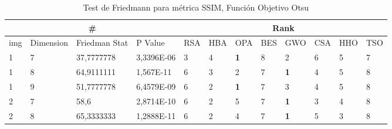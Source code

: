 \documentclass[conference]{IEEEtran}
\begin{document}
\begin{table}[]
	\centering
	\caption{Test de Friedmann para métrica SSIM, Función Objetivo Otsu}
	\begin{tabular}{|llll|llllllll|}
		\hline
		\multicolumn{4}{|c|}{\#} & \multicolumn{8}{c|}{Rank} \\ \hline
		\multicolumn{1}{|l|}{img} & \multicolumn{1}{l|}{Dimension} & \multicolumn{1}{l|}{Friedman Stat} & P Value    & \multicolumn{1}{l|}{RSA} & \multicolumn{1}{l|}{HBA}        & \multicolumn{1}{l|}{OPA}        & \multicolumn{1}{l|}{BES}        & \multicolumn{1}{l|}{GWO}        & \multicolumn{1}{l|}{CSA}        & \multicolumn{1}{l|}{HHO} & TSO                    \\ \hline
		\multicolumn{1}{|l|}{1}   & \multicolumn{1}{l|}{7}         & \multicolumn{1}{l|}{37,7777778}    & 3,3396E-06 & \multicolumn{1}{l|}{3}   & \multicolumn{1}{l|}{4}          & \multicolumn{1}{l|}{\textbf{1}} & \multicolumn{1}{l|}{8}          & \multicolumn{1}{l|}{2}          & \multicolumn{1}{l|}{6}          & \multicolumn{1}{l|}{5}   & 7                      \\ \hline
		\multicolumn{1}{|l|}{1}   & \multicolumn{1}{l|}{8}         & \multicolumn{1}{l|}{64,9111111}    & 1,567E-11  & \multicolumn{1}{l|}{6}   & \multicolumn{1}{l|}{3}          & \multicolumn{1}{l|}{2}          & \multicolumn{1}{l|}{7}          & \multicolumn{1}{l|}{\textbf{1}} & \multicolumn{1}{l|}{4}          & \multicolumn{1}{l|}{5}   & 8                      \\ \hline
		\multicolumn{1}{|l|}{1}   & \multicolumn{1}{l|}{9}         & \multicolumn{1}{l|}{51,7777778}    & 6,4579E-09 & \multicolumn{1}{l|}{6}   & \multicolumn{1}{l|}{2}          & \multicolumn{1}{l|}{\textbf{1}} & \multicolumn{1}{l|}{7}          & \multicolumn{1}{l|}{3}          & \multicolumn{1}{l|}{4}          & \multicolumn{1}{l|}{5}   & 8                      \\ \hline
		\multicolumn{1}{|l|}{2}   & \multicolumn{1}{l|}{7}         & \multicolumn{1}{l|}{58,6}          & 2,8714E-10 & \multicolumn{1}{l|}{6}   & \multicolumn{1}{l|}{2}          & \multicolumn{1}{l|}{5}          & \multicolumn{1}{l|}{7}          & \multicolumn{1}{l|}{\textbf{1}} & \multicolumn{1}{l|}{3}          & \multicolumn{1}{l|}{4}   & 8                      \\ \hline
		\multicolumn{1}{|l|}{2}   & \multicolumn{1}{l|}{8}         & \multicolumn{1}{l|}{65,3333333}    & 1,2888E-11 & \multicolumn{1}{l|}{6}   & \multicolumn{1}{l|}{2}          & \multicolumn{1}{l|}{4}          & \multicolumn{1}{l|}{7}          & \multicolumn{1}{l|}{\textbf{1}} & \multicolumn{1}{l|}{5}          & \multicolumn{1}{l|}{3}   & 8                      \\ \hline

\end{tabular}
\end{table}
\end{document}
